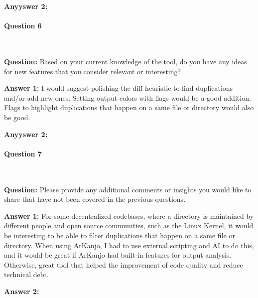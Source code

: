 \textbf{Anyyswer 2:}

\paragraph{Question 6}

\

\textbf{Question:} Based on your current knowledge of the tool, do you have any ideas 
for new features that you consider relevant or interesting?

\textbf{Answer 1:} I would suggest polishing the diff heuristic to find duplications and/or add new ones. 
Setting output colors with flags would be a good addition. Flags to highlight duplications that happen on 
a same file or directory would also be good.

\textbf{Anyyswer 2:}

\paragraph{Question 7}

\

\textbf{Question:} Please provide any additional comments or insights you would like to 
share that have not been covered in the previous questions.

\textbf{Answer 1:} For some decentralized codebases, where a directory is maintained by different people 
and open source communities, such as the Linux Kernel, it would be interesting to be able to filter 
duplications that happen on a same file or directory. When using ArKanjo, I had to use external scripting 
and AI to do this, and it would be great if ArKanjo had built-in features for output analysis.
Otherwise, great tool that helped the improvement of code quality and reduce technical debt.

\textbf{Answer 2:}
